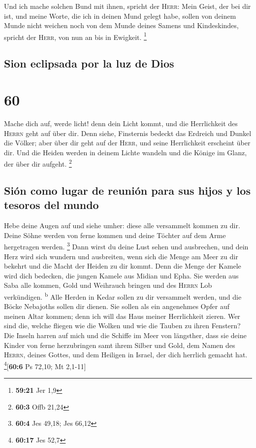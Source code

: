 Und ich mache solchen Bund mit ihnen, spricht der
\textsc{Herr}: Mein Geist, der bei dir ist, und meine Worte, die ich in
deinen Mund gelegt habe, sollen von deinem Munde nicht weichen noch von
dem Munde deines Samens und Kindeskindes, spricht der \textsc{Herr}, von
nun an bis in Ewigkeit. \footnote{\textbf{59:21} Jer 1,9}

\hypertarget{sion-eclipsada-por-la-luz-de-dios}{%
\subsection{Sion eclipsada por la luz de
Dios}\label{sion-eclipsada-por-la-luz-de-dios}}

\hypertarget{section-59}{%
\section{60}\label{section-59}}

 Mache dich auf, werde licht! denn dein Licht kommt, und
die Herrlichkeit des \textsc{Herrn} geht auf über dir. 
Denn siehe, Finsternis bedeckt das Erdreich und Dunkel die Völker; aber
über dir geht auf der \textsc{Herr}, und seine Herrlichkeit erscheint
über dir.  Und die Heiden werden in deinem Lichte wandeln
und die Könige im Glanz, der über dir aufgeht. \footnote{\textbf{60:3}
  Offb 21,24}

\hypertarget{siuxf3n-como-lugar-de-reuniuxf3n-para-sus-hijos-y-los-tesoros-del-mundo}{%
\subsection{Sión como lugar de reunión para sus hijos y los tesoros del
mundo}\label{siuxf3n-como-lugar-de-reuniuxf3n-para-sus-hijos-y-los-tesoros-del-mundo}}

 Hebe deine Augen auf und siehe umher: diese alle
versammelt kommen zu dir. Deine Söhne werden von ferne kommen und deine
Töchter auf dem Arme hergetragen werden. \footnote{\textbf{60:4} Jes
  49,18; Jes 66,12}  Dann wirst du deine Lust sehen und
ausbrechen, und dein Herz wird sich wundern und ausbreiten, wenn sich
die Menge am Meer zu dir bekehrt und die Macht der Heiden zu dir kommt.
 Denn die Menge der Kamele wird dich bedecken, die jungen
Kamele aus Midian und Epha. Sie werden aus Saba alle kommen, Gold und
Weihrauch bringen und des \textsc{Herrn} Lob verkündigen.
\textsuperscript{b}  Alle Herden in Kedar sollen zu dir
versammelt werden, und die Böcke Nebajoths sollen dir dienen. Sie sollen
als ein angenehmes Opfer auf meinen Altar kommen; denn ich will das Haus
meiner Herrlichkeit zieren.  Wer sind die, welche fliegen
wie die Wolken und wie die Tauben zu ihren Fenstern?  Die
Inseln harren auf mich und die Schiffe im Meer von längsther, dass sie
deine Kinder von ferne herzubringen samt ihrem Silber und Gold, dem
Namen des \textsc{Herrn}, deines Gottes, und dem Heiligen in Israel, der
dich herrlich gemacht hat. \footnote{\textbf{60:17} Jes 52,7}{[}\textbf{60:6}
Ps 72,10; Mt 2,1-11{]}

